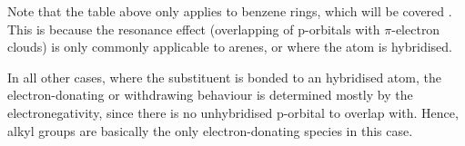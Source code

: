 				Note that the table above only applies to benzene rings, which will be covered \hyperlink{ChapterArenes}{}. This is because
				the resonance effect (overlapping of p-orbitals with $\pi$-electron clouds) is only commonly applicable to arenes, or where
				the atom is \sptwo hybridised.

				In all other cases, where the substituent is bonded to an \spthree hybridised atom, the electron-donating or withdrawing
				behaviour is determined mostly by the electronegativity, since there is no unhybridised p-orbital to overlap with. Hence,
				alkyl groups are basically the only electron-donating species in this case.


















